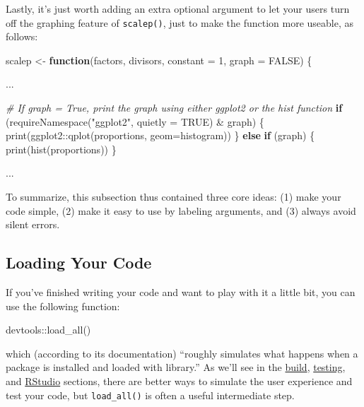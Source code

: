 \documentclass[
]{book}
\newenvironment{Shaded}{\begin{snugshade}}{\end{snugshade}}
\newcommand{\AttributeTok}[1]{\textcolor[rgb]{0.77,0.63,0.00}{#1}}
\newcommand{\CommentTok}[1]{\textcolor[rgb]{0.56,0.35,0.01}{\textit{#1}}}
\newcommand{\ConstantTok}[1]{\textcolor[rgb]{0.00,0.00,0.00}{#1}}
\newcommand{\ControlFlowTok}[1]{\textcolor[rgb]{0.13,0.29,0.53}{\textbf{#1}}}
\newcommand{\DecValTok}[1]{\textcolor[rgb]{0.00,0.00,0.81}{#1}}
\newcommand{\FunctionTok}[1]{\textcolor[rgb]{0.00,0.00,0.00}{#1}}
\newcommand{\NormalTok}[1]{#1}
\newcommand{\OtherTok}[1]{\textcolor[rgb]{0.56,0.35,0.01}{#1}}
\newcommand{\SpecialCharTok}[1]{\textcolor[rgb]{0.00,0.00,0.00}{#1}}
\newcommand{\StringTok}[1]{\textcolor[rgb]{0.31,0.60,0.02}{#1}}
\begin{document}
Lastly, it's just worth adding an extra optional argument to let your users turn off the graphing feature of \texttt{scalep()}, just to make the function more useable, as follows:

\begin{Shaded}
\begin{Highlighting}[]
\NormalTok{scalep }\OtherTok{\textless{}{-}} \ControlFlowTok{function}\NormalTok{(factors, divisors, }\AttributeTok{constant =} \DecValTok{1}\NormalTok{, }\AttributeTok{graph =} \ConstantTok{FALSE}\NormalTok{) \{}

\NormalTok{  ...}

  \CommentTok{\# If graph = True, print the graph using either ggplot2 or the hist function}
  \ControlFlowTok{if}\NormalTok{ (}\FunctionTok{requireNamespace}\NormalTok{(}\StringTok{"ggplot2"}\NormalTok{, }\AttributeTok{quietly =} \ConstantTok{TRUE}\NormalTok{) }\SpecialCharTok{\&}\NormalTok{ graph) \{}
    \FunctionTok{print}\NormalTok{(ggplot2}\SpecialCharTok{::}\FunctionTok{qplot}\NormalTok{(proportions, }\AttributeTok{geom=}\StringTok{\textquotesingle{}histogram\textquotesingle{}}\NormalTok{))}
\NormalTok{  \} }\ControlFlowTok{else} \ControlFlowTok{if}\NormalTok{ (graph) \{}
    \FunctionTok{print}\NormalTok{(}\FunctionTok{hist}\NormalTok{(proportions))}
\NormalTok{  \}}

\NormalTok{  ...}
\end{Highlighting}
\end{Shaded}

To summarize, this subsection thus contained three core ideas: (1) make your code simple, (2) make it easy to use by labeling arguments, and (3) always avoid silent errors.

\hypertarget{loading-your-code}{%
\subsection{Loading Your Code}\label{loading-your-code}}

If you've finished writing your code and want to play with it a little bit, you can use the following function:

\begin{Shaded}
\begin{Highlighting}[]
\NormalTok{devtools}\SpecialCharTok{::}\FunctionTok{load\_all}\NormalTok{()}
\end{Highlighting}
\end{Shaded}

which (according to its documentation) ``roughly simulates what happens when a package is installed and loaded with library.'' As we'll see in the \protect\hyperlink{releasing-your-package}{build}, \protect\hyperlink{testing}{testing}, and \href{./integrated-development-environments.html\#ex-building-packages}{RStudio} sections, there are better ways to simulate the user experience and test your code, but \texttt{load\_all()} is often a useful intermediate step.
\end{document}
